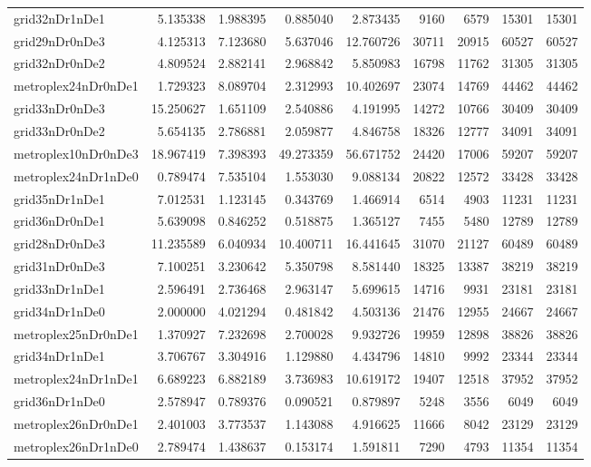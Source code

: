 \begin{longtable}{|l|r|r|r|r|r|r|r|r|}
grid32nDr1nDe1 & 5.135338 & 1.988395 & 0.885040 & 2.873435 & 9160 & 6579 & 15301 & 15301 \\
grid29nDr0nDe3 & 4.125313 & 7.123680 & 5.637046 & 12.760726 & 30711 & 20915 & 60527 & 60527 \\
grid32nDr0nDe2 & 4.809524 & 2.882141 & 2.968842 & 5.850983 & 16798 & 11762 & 31305 & 31305 \\
metroplex24nDr0nDe1 & 1.729323 & 8.089704 & 2.312993 & 10.402697 & 23074 & 14769 & 44462 & 44462 \\
grid33nDr0nDe3 & 15.250627 & 1.651109 & 2.540886 & 4.191995 & 14272 & 10766 & 30409 & 30409 \\
grid33nDr0nDe2 & 5.654135 & 2.786881 & 2.059877 & 4.846758 & 18326 & 12777 & 34091 & 34091 \\
metroplex10nDr0nDe3 & 18.967419 & 7.398393 & 49.273359 & 56.671752 & 24420 & 17006 & 59207 & 59207 \\
metroplex24nDr1nDe0 & 0.789474 & 7.535104 & 1.553030 & 9.088134 & 20822 & 12572 & 33428 & 33428 \\
grid35nDr1nDe1 & 7.012531 & 1.123145 & 0.343769 & 1.466914 & 6514 & 4903 & 11231 & 11231 \\
grid36nDr0nDe1 & 5.639098 & 0.846252 & 0.518875 & 1.365127 & 7455 & 5480 & 12789 & 12789 \\
grid28nDr0nDe3 & 11.235589 & 6.040934 & 10.400711 & 16.441645 & 31070 & 21127 & 60489 & 60489 \\
grid31nDr0nDe3 & 7.100251 & 3.230642 & 5.350798 & 8.581440 & 18325 & 13387 & 38219 & 38219 \\
grid33nDr1nDe1 & 2.596491 & 2.736468 & 2.963147 & 5.699615 & 14716 & 9931 & 23181 & 23181 \\
grid34nDr1nDe0 & 2.000000 & 4.021294 & 0.481842 & 4.503136 & 21476 & 12955 & 24667 & 24667 \\
metroplex25nDr0nDe1 & 1.370927 & 7.232698 & 2.700028 & 9.932726 & 19959 & 12898 & 38826 & 38826 \\
grid34nDr1nDe1 & 3.706767 & 3.304916 & 1.129880 & 4.434796 & 14810 & 9992 & 23344 & 23344 \\
metroplex24nDr1nDe1 & 6.689223 & 6.882189 & 3.736983 & 10.619172 & 19407 & 12518 & 37952 & 37952 \\
grid36nDr1nDe0 & 2.578947 & 0.789376 & 0.090521 & 0.879897 & 5248 & 3556 & 6049 & 6049 \\
metroplex26nDr0nDe1 & 2.401003 & 3.773537 & 1.143088 & 4.916625 & 11666 & 8042 & 23129 & 23129 \\
metroplex26nDr1nDe0 & 2.789474 & 1.438637 & 0.153174 & 1.591811 & 7290 & 4793 & 11354 & 11354 \\

\end{longtable}
